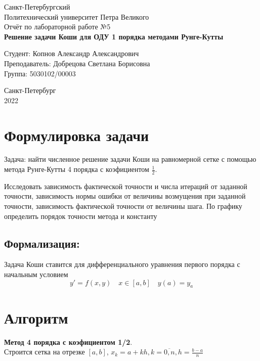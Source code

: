 \documentclass[a4paper]{article}
\begin{document}
\begin{titlepage}
  \Large
  \begin{center}
    Санкт-Петербургский\\
    Политехнический университет Петра Великого\\
    \vspace{10em}
    Отчёт по лабораторной работе №5\\
    \vspace{2em}
    \textbf{Решение задачи Коши для ОДУ 1 порядка методами Рунге-Кутты}
  \end{center}
  \vspace{6em}
  \begin{flushright}
    Студент: Копнов Александр Александрович\\
    Преподаватель: Добрецова Светлана Борисовна\\
    Группа: 5030102/00003
  \end{flushright}
  \vspace{\fill}
  \begin{center}
    Санкт-Петербург\\
    2022
  \end{center}
\end{titlepage}
\pagebreak
\section{Формулировка задачи}\label{sec:S1}
Задача: найти численное решение задачи Коши на равномерной сетке с помощью метода Рунге-Кутты 4 порядка с коэфициентом
\(\frac{1}{2}\).

Исследовать зависимость фактической точности и числа итераций от заданной точности, зависимость нормы ошибки от величины
возмущения при заданной точности, зависимость фактической точности от величины шага. По графику определить порядок
точности метода и константу
\subsection{Формализация:}\label{subsec:SS1}
Задача Коши ставится для дифференциального уравнения первого порядка с начальным условием \[
  y' = f(x,y) \quad x \in [a,b] \quad y(a) = y_{a}
\]
\section{Алгоритм}\label{sec:S2}
\textbf{Метод 4 порядка с коэфициентом 1/2}.\\
Строится сетка на отрезке \([a,b]\), \(x_{k} = a + kh, k = \overline{0,n}, h = \frac{b-a}{n}\)
\end{document}
